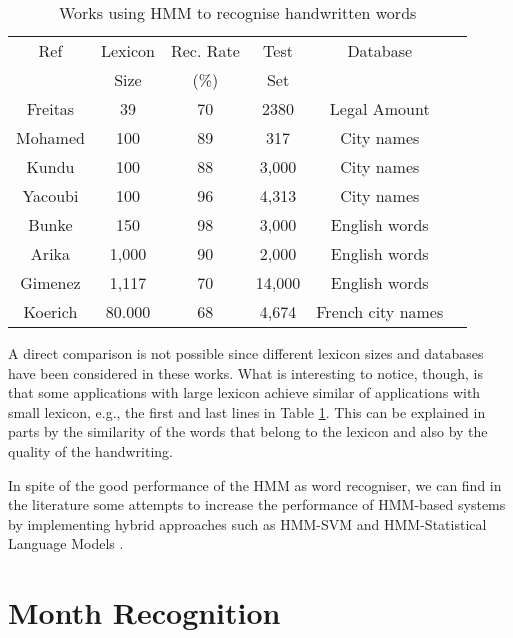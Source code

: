 \documentclass{article}[14pt, oneside, a4paper, times]
\begin{document}
\begin{table} [ht!]
\caption {Works using HMM to recognise handwritten words}
\begin{center}
\begin{tabular}{cccccc} \hline 
 \multicolumn{1}{c}{Ref}&
 \multicolumn{1}{c}{Lexicon}&
\multicolumn{1}{c}{Rec. Rate}&
 \multicolumn{1}{c}{Test}&
 \multicolumn{1}{c}{Database} \\
 \multicolumn{1}{c}{}&
 \multicolumn{1}{c}{Size}&
\multicolumn{1}{c}{(\%)}&
 \multicolumn{1}{c}{Set}&
 \multicolumn{1}{c}{} \\ \hline

Freitas \cite{Freitas01}  & 39    & 70 & 2380 & Legal Amount \\
Mohamed \cite{Mohamed96} &  100   & 89 & 317 & City names \\
Kundu \cite{Kundu2002} &  100   & 88 & 3,000 & City names \\
Yacoubi \cite{ElYacoubi99} &  100 & 96 & 4,313 & City names \\
Bunke \cite{Bunke95}    &  150  & 98 & 3,000 & English words \\
Arika \cite{Arika2002}  & 1,000 & 90 & 2,000 & English words \\
Gimenez \cite{Gimenez2009}& 1,117 & 70 & 14,000 & English words \\
Koerich \cite{Koerich2005}& 80.000& 68 &  4,674 & French city names \\ \hline
 
\end{tabular}
\label{summary-hmm:tab}
\end{center}
\end{table}

A direct comparison is not possible since different lexicon sizes and databases have been considered in these works. What is interesting to notice, though, is that some applications with large lexicon achieve similar of applications with small lexicon, e.g., the first and last lines in Table \ref{summary-hmm:tab}. This can be explained in parts by the similarity of the words that belong to the lexicon and also by the quality of the handwriting. 

In spite of the good performance of the HMM as word recogniser, we can find in the literature some attempts to increase the performance of HMM-based systems by implementing hybrid approaches such as HMM-SVM \cite{Ahmad2009} and HMM-Statistical Language Models \cite{Marti01}.

\section{Month Recognition}
\end{document}
